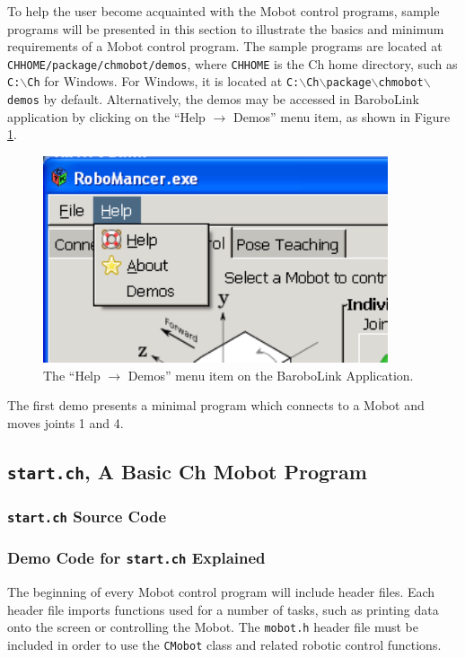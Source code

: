 \documentclass{article}
\begin{document}
To help the user become acquainted with the Mobot control programs, sample
programs will be presented in this section to illustrate the basics and minimum requirements of
a Mobot control program. The sample programs are located at
\texttt{CHHOME/package/chmobot/demos}, where \texttt{CHHOME} is the
Ch home directory, such as \texttt{C:$\backslash$Ch} for Windows. For Windows,
it is located at \texttt{C:$\backslash$Ch$\backslash$package$\backslash$chmobot$\backslash$demos} by default.
Alternatively, the demos may be accessed in BaroboLink application
by clicking on the ``Help $\rightarrow$ Demos'' menu item, as shown in Figure
\ref{fig:help_demos_screenshot}.

\begin{figure}
  \centering
  \includegraphics[width=4in]{images/help_demos_screenshot.png}
  \caption{The ``Help $\rightarrow$ Demos'' menu item on the BaroboLink Application.}
  \label{fig:help_demos_screenshot}
\end{figure}


The first demo presents a minimal program which connects to a Mobot and
moves joints 1 and 4.

\subsection{\texttt{start.ch}, A Basic Ch Mobot Program}
\subsubsection{\texttt{start.ch} Source Code}


\subsubsection{\label{sec:democode}Demo Code for \texttt{start.ch} Explained}
The beginning of every Mobot control program will include header files. Each
header file imports functions used for a number of tasks, such as printing
data onto the screen or controlling the Mobot. The \texttt{mobot.h} header
file must be included in order to use the \texttt{CMobot} class and related
robotic control functions.
\end{document}
